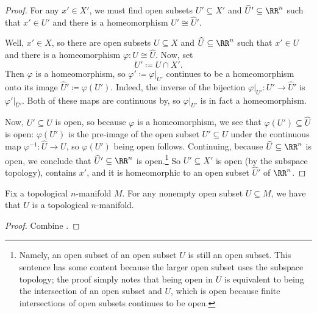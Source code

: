 \documentclass[../notes.tex]{subfiles}
\begin{document}
\begin{proof}
	For any $x'\in X'$, we must find open subsets $U'\subseteq X'$ and $\widehat U'\subseteq\RR^n$ such that $x'\in U'$ and there is a homeomorphism $U'\cong\widehat U'$.

	Well, $x'\in X$, so there are open subsets $U\subseteq X$ and $\widehat U\subseteq\RR^n$ such that $x'\in U$ and there is a homeomorphism $\varphi\colon U\cong\widehat U$. Now, set
	\[U'\coloneqq U\cap X'.\]
	Then $\varphi$ is a homeomorphism, so $\varphi'\coloneqq\varphi|_{U'}$ continues to be a homeomorphism onto its image $\widehat U'\coloneqq\varphi(U')$. Indeed, the inverse of the bijection $\varphi|_{U'}\colon U'\to\widehat U'$ is $\varphi'|_{\widehat U'}$. Both of these maps are continuous by, so $\varphi|_{U'}$ is in fact a homeomorphism.
	
	Now, $U'\subseteq U$ is open, so because $\varphi$ is a homeomorphism, we see that $\varphi(U')\subseteq\widehat U$ is open: $\varphi(U')$ is the pre-image of the open subset $U'\subseteq U$ under the continuous map $\varphi^{-1}\colon\widehat U\to U$, so $\varphi(U')$ being open follows. Continuing, because $\widehat U\subseteq\RR^n$ is open, we conclude that $\widehat U'\subseteq\RR^n$ is open.\footnote{Namely, an open subset of an open subset $U$ is still an open subset. This sentence has some content because the larger open subset uses the subspace topology; the proof simply notes that being open in $U$ is equivalent to being the intersection of an open subset and $U$, which is open because finite intersections of open subsets continues to be open.} So $U'\subseteq X'$ is open (by the subspace topology), contains $x'$, and it is homeomorphic to an open subset $\widehat U'$ of $\RR^n$.
\end{proof}
\begin{proposition} \label{prop:sub-top-man}
	Fix a topological $n$-manifold $M$. For any nonempty open subset $U\subseteq M$, we have that $U$ is a topological $n$-manifold.
\end{proposition}
\begin{proof}
	Combine .
\end{proof}
\end{document}

